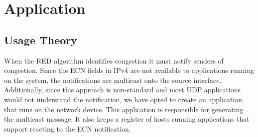 
\section{Application}
\label{sect:application}

\subsection{Usage Theory}
When the \ac{RED} algorithm identifies congestion it must notify senders of congestion.
Since the \ac{ECN} fields in IPv4 are not available to applications running on the system, the notifications are multicast onto the source interface.
Additionally, since this approach is non-standard and most UDP applications would not understand the notification, we have opted to create an application that runs on the network device.
This application is responsible for generating the multicast message.
It also keeps a register of hosts running applications that support reacting to the \ac{ECN} notification.


